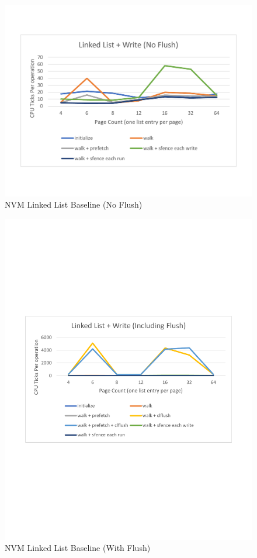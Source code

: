 \begin{figure}
    \centering
    \caption{NVM Linked List Baseline (No Flush)}\label{micro:llbaseline:noflush}
    \includegraphics[scale=0.35]{micro/nvm-linked-list-baseline-no-flush.pdf}
\end{figure}

\begin{figure}
    \centering
    \caption{NVM Linked List Baseline (With Flush)}\label{micro:llbaseline:flush}
    \includegraphics[scale=0.35]{micro/nvm-linked-list-baseline-with-flush.pdf}
\end{figure}


